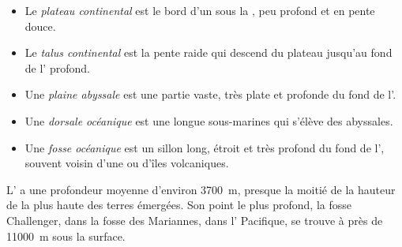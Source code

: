 \begin{definition}\label{def:g8:the-oceans:seafloor}
\begin{itemize}
  \item Le \emph{plateau continental} est le
        bord d'un  sous la , peu profond et en pente douce.
  \item Le \emph{talus continental} est la pente
        raide qui descend du plateau jusqu'au fond de l' profond.
  \item Une \emph{plaine abyssale} est une partie
        vaste, très plate et profonde du fond de l'.
  \item Une \emph{dorsale océanique}
        est une longue  sous-marines qui s'élève des
         abyssales.
  \item Une \emph{fosse océanique}
        est un sillon long, étroit et très profond du fond de l',
        souvent voisin d'une  ou d'îles volcaniques.
\end{itemize}
\end{definition}

L' a une profondeur moyenne d'environ \qty{3700}{m}, presque la
moitié de la hauteur de la plus haute  des terres émergées. Son
point le plus profond, la fosse Challenger, dans la fosse des Mariannes, dans
l' Pacifique, se trouve à près de \qty{11000}{m} sous la surface.


